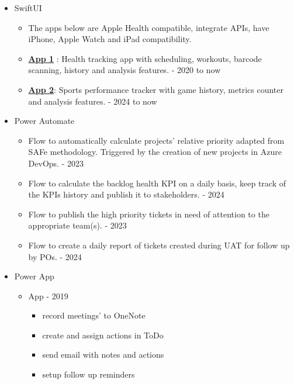 {\begin{itemize}
    \item SwiftUI
    \begin{itemize}
        \item The apps below are Apple Health compatible, integrate APIs, have iPhone, Apple Watch and iPad compatibility.
        \item \href{https://example.com/app1}{\textbf{App 1}} : Health tracking app with scheduling, workouts, barcode scanning, history and analysis features. - 2020 to now
        \item \href{https://example.com/app2}{\textbf{App 2}}: Sports performance tracker with game history, metrics counter and analysis features. - 2024 to now
    \end{itemize}

    \item Power Automate
    \begin{itemize}
        \item Flow to automatically calculate projects' relative priority adapted from SAFe methodology. Triggered by the creation of new projects in Azure DevOps. - 2023
        \item Flow to calculate the backlog health KPI on a daily basis, keep track of the KPIs history and publish it to stakeholders. - 2024
        \item Flow to publish the high priority tickets in need of attention to the appropriate team(s). - 2023
        \item Flow to create a daily report of tickets created during UAT for follow up by POs. - 2024
    \end{itemize}

    \item Power App
    \begin{itemize}
        \item App - 2019
        \begin{itemize}
            \item record meetings' to OneNote
            \item create and assign actions in ToDo
            \item send email with notes and actions
            \item setup follow up reminders
        \end{itemize}
    \end{itemize}


\end{itemize}}
